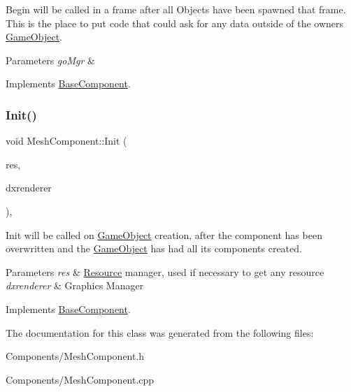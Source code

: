Begin will be called in a frame after all Objects have been spawned that frame. This is the place to put code that could ask for any data outside of the owner\textquotesingle{}s \hyperlink{classGameObject}{Game\+Object}. 


\begin{DoxyParams}{Parameters}
{\em go\+Mgr} & \\
\hline
\end{DoxyParams}


Implements \hyperlink{classBaseComponent}{Base\+Component}.

\mbox{\label{classMeshComponent_ad99787b15690dd9ae239590dcdad6993}} 
\subsubsection{\texorpdfstring{Init()}{Init()}}
{\footnotesize\ttfamily void Mesh\+Component\+::\+Init (\begin{DoxyParamCaption}\item[{\hyperlink{classResourceManager}{Resource\+Manager} $\ast$}]{res,  }\item[{\hyperlink{classDXRenderer}{D\+X\+Renderer} $\ast$}]{dxrenderer }\end{DoxyParamCaption})\hspace{0.3cm}{\ttfamily [override]}, {\ttfamily [virtual]}}



Init will be called on \hyperlink{classGameObject}{Game\+Object} creation, after the component has been overwritten and the \hyperlink{classGameObject}{Game\+Object} has had all its components created. 


\begin{DoxyParams}{Parameters}
{\em res} & \hyperlink{structResource}{Resource} manager, used if necessary to get any resource \\
\hline
{\em dxrenderer} & Graphic\textquotesingle{}s Manager \\
\hline
\end{DoxyParams}


Implements \hyperlink{classBaseComponent}{Base\+Component}.



The documentation for this class was generated from the following files\+:\begin{DoxyCompactItemize}
\item 
Components/Mesh\+Component.\+h\item 
Components/Mesh\+Component.\+cpp\end{DoxyCompactItemize}
